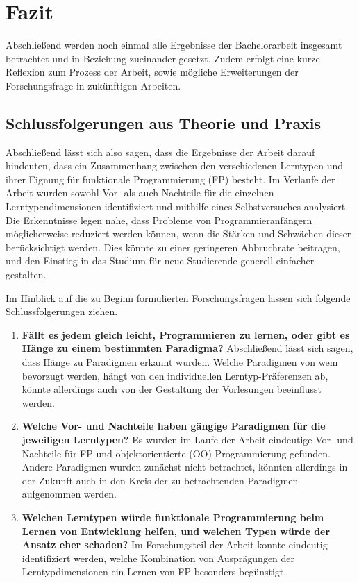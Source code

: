 \clearpage
\section{Fazit}
\label{sec:conclusion}

Abschließend werden noch einmal alle Ergebnisse der Bachelorarbeit insgesamt betrachtet und in Beziehung zueinander gesetzt. Zudem erfolgt eine kurze Reflexion zum Prozess der Arbeit, sowie mögliche Erweiterungen der Forschungsfrage in zukünftigen Arbeiten.

\subsection{Schlussfolgerungen aus Theorie und Praxis}
Abschließend lässt sich also sagen, dass die Ergebnisse der Arbeit darauf hindeuten, dass ein Zusammenhang zwischen den verschiedenen Lerntypen und ihrer Eignung für funktionale Programmierung (FP) besteht.
Im Verlaufe der Arbeit wurden sowohl Vor- als auch Nachteile für die einzelnen Lerntypendimensionen identifiziert und mithilfe eines Selbstversuches analysiert. Die Erkenntnisse legen nahe, dass Probleme von Programmieranfängern möglicherweise reduziert werden können, wenn die Stärken und Schwächen dieser berücksichtigt werden. Dies könnte zu einer geringeren Abbruchrate beitragen, und den Einstieg in das Studium für neue Studierende generell einfacher gestalten.

Im Hinblick auf die zu Beginn formulierten Forschungsfragen lassen sich folgende Schlussfolgerungen ziehen.

\begin{enumerate}
    \item \textbf{Fällt es jedem gleich leicht, Programmieren zu lernen, oder gibt es Hänge zu einem bestimmten Paradigma?} Abschließend lässt sich sagen, dass Hänge zu Paradigmen erkannt wurden. Welche Paradigmen von wem bevorzugt werden, hängt von den individuellen Lerntyp-Präferenzen ab, könnte allerdings auch von der Gestaltung der Vorlesungen beeinflusst werden.
    \item \textbf{Welche Vor- und Nachteile haben gängige Paradigmen für die jeweiligen Lerntypen?} Es wurden im Laufe der Arbeit eindeutige Vor- und Nachteile für FP und objektorientierte (OO) Programmierung gefunden. Andere Paradigmen wurden zunächst nicht betrachtet, könnten allerdings in der Zukunft auch in den Kreis der zu betrachtenden Paradigmen aufgenommen werden.
    \item \textbf{Welchen Lerntypen würde funktionale Programmierung beim Lernen von Entwicklung helfen, und welchen Typen würde der Ansatz eher schaden?} Im Forschungsteil der Arbeit konnte eindeutig identifiziert werden, welche Kombination von Ausprägungen der Lerntypdimensionen ein Lernen von FP besonders begünstigt.
\end{enumerate}

